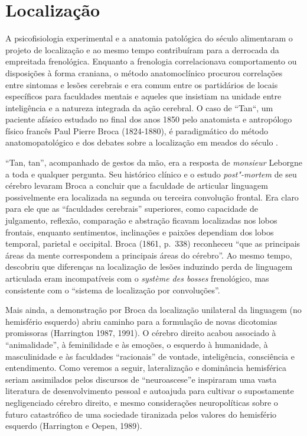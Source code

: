 \chapter{Localização}

A psicofisiologia experimental e a anatomia patológica do século 
alimentaram o projeto de localização e ao mesmo tempo contribuíram para
a derrocada da empreitada frenológica. Enquanto a frenologia
correlacionava comportamento ou disposições à forma craniana, o método
anatomoclínico procurou correlações entre sintomas e lesões cerebrais e
era comum entre os partidários de locais específicos para faculdades
mentais e aqueles que insistiam na unidade entre inteligência e a
natureza integrada da ação cerebral. O caso de ``Tan``, um paciente
afásico estudado no final dos anos 1850 pelo anatomista e antropólogo
físico francês Paul Pierre Broca (1824-1880), é paradigmático do método
anatomopatológico e dos debates sobre a localização em meados do século
.

``Tan, tan'', acompanhado de gestos da mão, era a resposta de
\emph{monsieur} Leborgne a toda e qualquer pergunta. Seu histórico
clínico e o estudo \emph{post"-mortem} de seu cérebro levaram Broca a
concluir que a faculdade de articular linguagem possivelmente era
localizada na segunda ou terceira convolução frontal. Era claro para ele
que as ``faculdades cerebrais'' superiores, como capacidade de
julgamento, reflexão, comparação e abstração ficavam localizadas nos
lobos frontais, enquanto sentimentos, inclinações e paixões dependiam
dos lobos temporal, parietal e occipital. Broca (1861, p.~338) reconheceu
``que as principais áreas da mente correspondem a principais áreas do
cérebro''. Ao mesmo tempo, descobriu que diferenças na localização de
lesões induzindo perda de linguagem articulada eram incompatíveis com o
\emph{système des bosses} frenológico, mas consistente com o ``sistema
de localização por convoluções''.

Mais ainda, a demonstração por Broca da localização unilateral da
linguagem (no hemisfério esquerdo) abriu caminho para a formulação de
novas dicotomias promissoras (Harrington 1987, 1991). O cérebro direito
acabou associado à ``animalidade'', à feminilidade e às emoções, o
esquerdo à humanidade, à masculinidade e às faculdades ``racionais'' de
vontade, inteligência, consciência e entendimento. Como veremos a
seguir, lateralização e dominância hemisférica seriam assimilados pelos
discursos de ``neuroascese''e inspiraram uma vasta literatura de
desenvolvimento pessoal e autoajuda para cultivar o supostamente
negligenciado cérebro direito, e mesmo considerações neuropolíticas
sobre o futuro catastrófico de uma sociedade tiranizada pelos valores do
hemisfério esquerdo (Harrington e Oepen, 1989).

